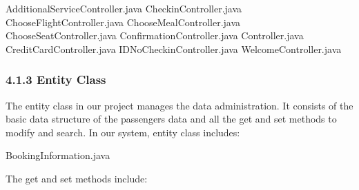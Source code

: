 \documentclass[
]{article}
\newenvironment{Shaded}{}{}
\newcommand{\NormalTok}[1]{#1}
\begin{document}
\begin{Shaded}
\begin{Highlighting}[]
\NormalTok{AdditionalServiceController.java}
\NormalTok{CheckinController.java}
\NormalTok{ChooseFlightController.java}
\NormalTok{ChooseMealController.java}
\NormalTok{ChooseSeatController.java}
\NormalTok{ConfirmationController.java}
\NormalTok{Controller.java}
\NormalTok{CreditCardController.java}
\NormalTok{IDNoCheckinController.java}
\NormalTok{WelcomeController.java}
\end{Highlighting}
\end{Shaded}

\hypertarget{413-entity-class}{%
\subsubsection{4.1.3 Entity Class}\label{413-entity-class}}

The entity class in our project manages the data administration. It
consists of the basic data structure of the passengers data and all the
get and set methods to modify and search. In our system, entity class
includes:

\begin{Shaded}
\begin{Highlighting}[]
\NormalTok{BookingInformation.java}
\end{Highlighting}
\end{Shaded}

The get and set methods include:
\end{document}
